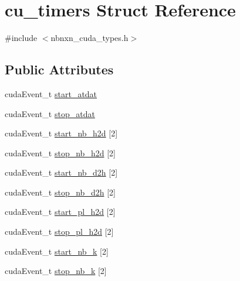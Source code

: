 \hypertarget{structcu__timers}{\section{cu\-\_\-timers \-Struct \-Reference}
\label{structcu__timers}
}


{\ttfamily \#include $<$nbnxn\-\_\-cuda\-\_\-types.\-h$>$}

\subsection*{\-Public \-Attributes}
\begin{DoxyCompactItemize}
\item 
cuda\-Event\-\_\-t \hyperlink{structcu__timers_af6d87c7ba4498ffb72f82fc3171d192f}{start\-\_\-atdat}
\item 
cuda\-Event\-\_\-t \hyperlink{structcu__timers_a09a214a1c59ce48deac0bc776139d433}{stop\-\_\-atdat}
\item 
cuda\-Event\-\_\-t \hyperlink{structcu__timers_ab6af0f88daf5b1a187fa36c5a76db2f7}{start\-\_\-nb\-\_\-h2d} \mbox{[}2\mbox{]}
\item 
cuda\-Event\-\_\-t \hyperlink{structcu__timers_adf9e9de41070be50fde86f58ac12f3d4}{stop\-\_\-nb\-\_\-h2d} \mbox{[}2\mbox{]}
\item 
cuda\-Event\-\_\-t \hyperlink{structcu__timers_a16f3ae5e6f9905eb01b4b100c063217f}{start\-\_\-nb\-\_\-d2h} \mbox{[}2\mbox{]}
\item 
cuda\-Event\-\_\-t \hyperlink{structcu__timers_a10e811f9746b71d8299d81d53db85233}{stop\-\_\-nb\-\_\-d2h} \mbox{[}2\mbox{]}
\item 
cuda\-Event\-\_\-t \hyperlink{structcu__timers_a8414ac53788403595755da65bad0e281}{start\-\_\-pl\-\_\-h2d} \mbox{[}2\mbox{]}
\item 
cuda\-Event\-\_\-t \hyperlink{structcu__timers_a4b0ba4ce55b4d959556a621bbc24d606}{stop\-\_\-pl\-\_\-h2d} \mbox{[}2\mbox{]}
\item 
cuda\-Event\-\_\-t \hyperlink{structcu__timers_a12472be878f452a7433068b53e326546}{start\-\_\-nb\-\_\-k} \mbox{[}2\mbox{]}
\item 
cuda\-Event\-\_\-t \hyperlink{structcu__timers_a70b6c6bfab0cd2581a6c837b36c7b33f}{stop\-\_\-nb\-\_\-k} \mbox{[}2\mbox{]}
\end{DoxyCompactItemize}


